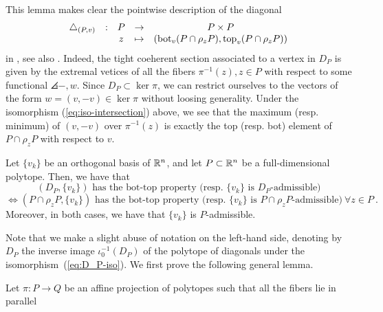 This lemma makes clear the pointwise description of the diagonal 
\begin{equation*}
\begin{matrix}
    \triangle_{(P,v)} & : & P & \to & P \times P \\
    & & z  & \mapsto & (\operatorname{bot}_v(P \cap \rho_z P),\operatorname{top}_v(P \cap \rho_z P))
\end{matrix}
\end{equation*}
in \cite[Definition 10]{MTTV19}, see also \cite[Proposition 1.15]{GLA21}. 
Indeed, the tight coeherent section associated to a vertex in $D_P$ is given by the extremal vetices of all the fibers $\pi^{-1}(z), z \in P$ with respect to some functional $\angles{-,w}$.
Since $D_P \subset \ker \pi$, we can restrict ourselves to the vectors of the form $w=(v,-v) \in \ker \pi$ without loosing generality. 
Under the isomorphism (\ref{eq:iso-intersection}) above, we see that the maximum (resp. minimum) of $(v,-v)$ over $\pi^{-1}(z)$ is exactly the top (resp. bot) element of $P\cap \rho_z P$ with respect to $v$. 

\begin{proposition}
    Let $\{v_k\}$ be an orthogonal basis of $\mathbb{R}^n$, and let $P\subset \mathbb{R}^n$ be a full-dimensional polytope. 
    Then, we have that
    \[
    (D_P,\{v_k\}) \text{ has the bot-top property (resp. } \{v_k\} \text{ is }D_P\text{-admissible)}  
    \]
    \[
    \iff (P\cap \rho_z P,\{v_k\}) \text{ has the bot-top property (resp. } \{v_k\} \text{ is }P\cap \rho_z P\text{-admissible)} \ \forall z \in P \ .
    \]
    Moreover, in both cases, we have that $\{v_k\}$ is $P$-admissible.
\end{proposition}
Note that we make a slight abuse of notation on the left-hand side, denoting by $D_P$ the inverse image $\iota_0^{-1}(D_P)$ of the polytope of diagonals under the isomorphism~(\ref{eq:D_P-iso}).
We first prove the following general lemma. 

\begin{lemma}
    Let $\pi : P\to Q$ be an affine projection of polytopes such that all the fibers lie in parallel  
\end{lemma}





